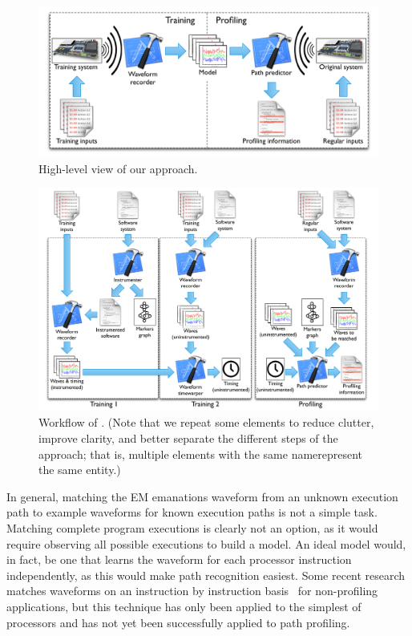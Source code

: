 \begin{figure}[tb]
\includegraphics[width=5in]{../issta_profile/profiling/figures/overviewzosp}
\caption{High-level view of our approach.}
\label{fig:overviewzosp}
\end{figure}

\begin{figure}[tb]
\includegraphics[width=\textwidth]{../issta_profile/profiling/figures/workflowzosp}
\caption{Workflow of \zop. (Note that we repeat some elements to reduce clutter, improve clarity, and better separate the different  steps of the approach; that is, multiple elements with the same namerepresent the same entity.)}
\label{fig:system_diagram}
\end{figure}

In general, matching the EM emanations waveform from an unknown execution path to example waveforms for known execution paths is not a simple task. Matching complete program executions is clearly not an option, as it would require observing all possible executions to build a model. An ideal model would, in fact, be one that learns the waveform for each processor instruction independently, as this would make path recognition easiest. Some recent research matches waveforms on an instruction by instruction basis~\cite{scandalee,msgna2014} for non-profiling applications, but this technique has only been applied to the simplest of processors and has not yet been successfully applied to path profiling.

